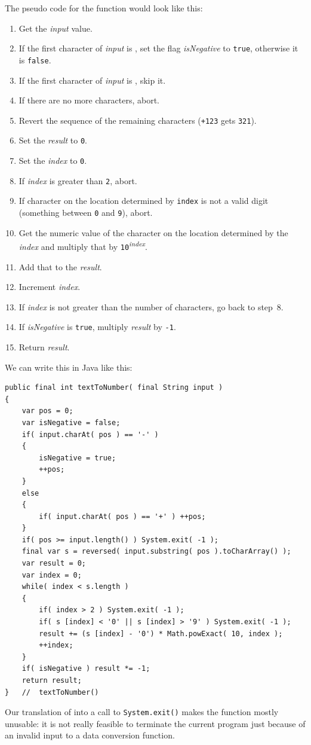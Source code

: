 The pseudo code for the function would look like this:
\begin{enumerate}[nosep]
	\item{Get the \textit{input} value.}
	\item{If the first character of \textit{input} is \bsq{-}, set the flag \textit{isNegative} to \lstinline|true|, otherwise it is \lstinline|false|.}
    \item{If the first character of \textit{input} is \bsq{+}, skip it.}
    \item{If there are no more characters, abort.}
    \item{Revert the sequence of the remaining characters (\texttt{+123} gets \texttt{321}).}
    \item{Set the \textit{result} to \texttt{0}.}
    \item{Set the \textit{index} to \texttt{0}.}
    \item{If \textit{index} is greater than \texttt{2}, abort.}
    \item{If character on the location determined by \texttt{index} is not a valid digit (something between \texttt{0} and \texttt{9}), abort.}
    \item{Get the numeric value of the character on the location determined by the \textit{index} and multiply that by \texttt{10}\textsuperscript{\textit{index}}.}
    \item{Add that to the \textit{result}.}
    \item{Increment \textit{index}.}
    \item{If \textit{index} is not greater than the number of characters, go back to step~8.}
    \item{If \textit{isNegative} is \lstinline|true|, multiply \textit{result} by \texttt{-1}.}
    \item{Return \textit{result}.}
\end{enumerate}

We can write this in Java like this:
\begin{lstlisting}
public final int textToNumber( final String input )
{
    var pos = 0;
    var isNegative = false;
    if( input.charAt( pos ) == '-' )
    {
        isNegative = true;
        ++pos;
    }
    else
    {
        if( input.charAt( pos ) == '+' ) ++pos;
    }
    if( pos >= input.length() ) System.exit( -1 );
    final var s = reversed( input.substring( pos ).toCharArray() );
    var result = 0;
    var index = 0;
    while( index < s.length )
    {
        if( index > 2 ) System.exit( -1 );
        if( s [index] < '0' || s [index] > '9' ) System.exit( -1 );
        result += (s [index] - '0') * Math.powExact( 10, index );
        ++index;
    }
    if( isNegative ) result *= -1;
    return result;
}   //  textToNumber()
\end{lstlisting}
Our translation of  into a call to \lstinline|System.exit()| makes the function mostly unusable: it is not really feasible to terminate the current program just because of an invalid input to a data conversion function.

